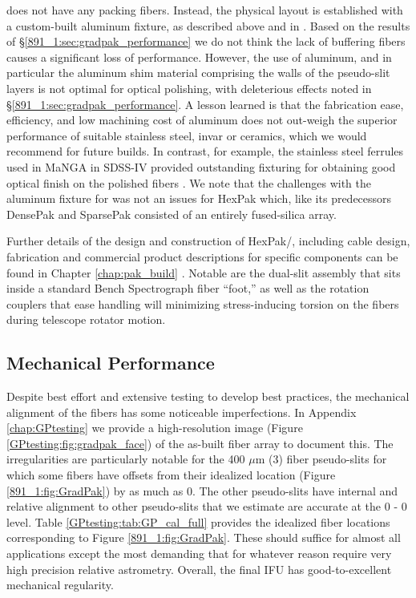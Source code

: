 \GP does not have any packing fibers. Instead, the physical layout is
established with a custom-built aluminum fixture, as described above
and in \citep{Wood12}. Based on the results of
\S\ref{891_1:sec:gradpak_performance} we do not think the lack of
buffering fibers causes a significant loss of performance. However,
the use of aluminum, and in particular the aluminum shim material
comprising the walls of the pseudo-slit layers is not optimal for
optical polishing, with deleterious effects noted in
\S\ref{891_1:sec:gradpak_performance}. A lesson learned is that the
fabrication ease, efficiency, and low machining cost of aluminum does
not out-weigh the superior performance of suitable stainless steel,
invar or ceramics, which we would recommend for future builds. In
contrast, for example, the stainless steel ferrules used in MaNGA in
SDSS-IV \citep{Bundy15} provided outstanding fixturing for obtaining
good optical finish on the polished fibers \citep{Drory15}.  We note
that the challenges with the aluminum fixture for \GP was not an
issues for HexPak which, like its predecessors DensePak
\citep{Barden94} and SparsePak \citep{Bershady04} consisted of an
entirely fused-silica array.

Further details of the design and construction of HexPak/\GP,
including cable design, fabrication and commercial product
descriptions for specific components can be found in Chapter
\ref{chap:pak_build} \citep[a reprint of ][]{Wood12}.  Notable are the
dual-slit assembly that sits inside a standard Bench Spectrograph
fiber ``foot,'' as well as the rotation couplers that ease handling
will minimizing stress-inducing torsion on the fibers during telescope
rotator motion.

\subsection{Mechanical Performance}

Despite best effort and extensive testing to develop best practices,
the mechanical alignment of the \GP fibers has some noticeable
imperfections. In Appendix \ref{chap:GPtesting} we provide a
high-resolution image (Figure \ref{GPtesting:fig:gradpak_face}) of the
as-built fiber array to document this. The irregularities are
particularly notable for the 400 $\mu$m (3) fiber pseudo-slits
for which some fibers have offsets from their idealized location
(Figure \ref{891_1:fig:GradPak}) by as much as 0. The other
pseudo-slits have internal and relative alignment to other
pseudo-slits that we estimate are accurate at the 0 - 0
level. Table \ref{GPtesting:tab:GP_cal_full} provides the idealized
fiber locations corresponding to Figure \ref{891_1:fig:GradPak}. These
should suffice for almost all applications except the most demanding
that for whatever reason require very high precision relative
astrometry. Overall, the final IFU has good-to-excellent mechanical
regularity.

